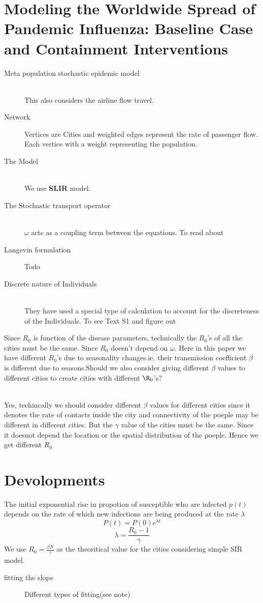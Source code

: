 \documentclass[14pt]{article}
\begin{document}
\section{Modeling the Worldwide Spread of Pandemic
Influenza: Baseline Case and Containment
Interventions}
\begin{description}
  \item[Meta population stochastic epidemic model] \hfill \\ This also
    considers the airline flow travel.
  \item[Network] Vertices are Cities and weighted edges represent the
    rate of passenger flow. Each vertice with a weight representing
    the population.
  \item[The Model] \hfill \\ We use \textbf{SLIR} model.
  \item[The Stochastic transport operator] \hfill \\ $\omega$ acts as
    a coupling term between the equations.{\color{blue} To read about}
  \item[Langevin formulation] {\color{blue} Todo}
  \item[Discrete nature of Individuals] \hfill \\ They have used a
    special type of calculation to account for the discreteness of the
    Individuals.{\color{blue} To see Text S1 and figure out}
\end{description}
 {\color{blue} Since $R_{0}$ is function of the disease
   parameters, technically the $R_{0}$'s of all the cities must be the
   same. Since $R_{0}$ doesn't depend on $\omega$. Here in this paper
   we have different $R_{0}$'s due to seasonality changes.ie, their
   transmission coefficient $\beta$ is different due to seasons.Should
   we also consider giving different $\beta$ values to different
   cities to create cities with different $\R_{0}$'s?}

 \\ Yes, techincally we should consider different $\beta$ values for different
 cities since it denotes the rate of contacts inside the city and
 connectivity of the poeple may be different in different cities. But
 the $\gamma$ value of the cities must be the same. Since it doesnot
 depend the location or the spatial distribution of the poeple. Hence we get different $R_{0}$
 \section{Devolopments}
 The initial exponential rise in propotion of susceptible who are
 infected $p(t)$ depends on the rate of which new infections are being
 produced at the rate $\lambda$
 $$P(t)=P(0)e^{\lambda t}$$
 $$\lambda = \frac{R_{0}-1}{\gamma}$$ We use $R_{0}=\frac{\beta
   N}{\gamma}$ as the theoritical value for the cities considering
 simple SIR model.
 \begin{description}
 \item[fitting the slope] Different types of fitting(see note)
 \end{description}
\end{document}
